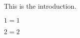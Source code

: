 This is the introduction.

\begin{theorem}
	\label{thm:1_eq_1}
	\(1=1\)
\end{theorem}
\begin{theorem}
	\label{thm:2_eq_2}
	\(2=2\)
\end{theorem}
